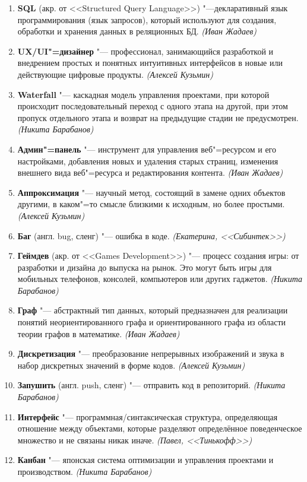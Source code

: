 \documentclass[14pt, a4paper]{extarticle}
\begin{document}
\begin{enumerate}
    \item \textbf{SQL} (акр. от <<Structured Query Language>>) "---декларативный язык программирования (язык запросов), который используют для создания, обработки и хранения данных в реляционных БД. \textit{(Иван Жадаев)}
    \item \textbf{UX/UI"=дизайнер} "--- профессионал, занимающийся разработкой и внедрением простых и понятных интуитивных интерфейсов в новые или действующие цифровые продукты. \textit{(Алексей Кузьмин)}
    \item \textbf{Waterfall} "--- каскадная модель управления проектами, при которой происходит последовательный переход с одного этапа на другой, при этом пропуск отдельного этапа и возврат на предыдущие стадии не предусмотрен. \textit{(Никита Барабанов)}
    \item \textbf{Админ"=панель} "--- инструмент для управления веб"=ресурсом и его настройками, добавления новых и удаления старых страниц, изменения внешнего вида веб"=ресурса и редактирования контента. \textit{(Иван Жадаев)}
    \item \textbf{Аппроксимация} "--- научный метод, состоящий в замене одних объектов другими, в каком"=то смысле близкими к исходным, но более простыми. \textit{(Алексей Кузьмин)}
    \item \textbf{Баг} (англ. bug, сленг) "--- ошибка в коде. \textit{(Екатерина, <<Сибинтек>>)}
    \item \textbf{Геймдев} (акр. от <<Games Development>>) "--- процесс создания игры: от разработки и дизайна до выпуска на рынок. Это могут быть игры для мобильных телефонов, консолей, компьютеров или других гаджетов. \textit{(Никита Барабанов)}
    \item \textbf{Граф} "--- абстрактный тип данных, который предназначен для реализации понятий неориентированного графа и ориентированного графа из области теории графов в математике. \textit{(Иван Жадаев)}
    \item \textbf{Дискретизация} "--- преобразование непрерывных изображений и звука в набор дискретных значений в форме кодов. \textit{(Алексей Кузьмин)}
    \item \textbf{Запушить} (англ. push, сленг) "--- отправить код в репозиторий. \textit{(Никита Барабанов)}
    \item \textbf{Интерфейс} "--- программная/синтаксическая структура, определяющая отношение между объектами, которые разделяют определённое поведенческое множество и не связаны никак иначе. \textit{(Павел, <<Тинькофф>>)}
    \item \textbf{Канбан} "--- японская система оптимизации и управления проектами и производством. \textit{(Никита Барабанов)}

\end{enumerate}
\end{document}
